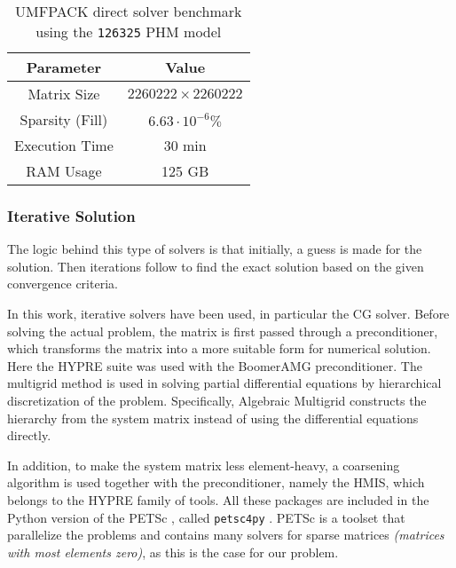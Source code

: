 \begin{table}[!ht]
	\centering
	\caption{\gls{UMFPACK} direct solver benchmark using the \texttt{126325} \gls{PHM} model}
	\label{tab:direct_solver_bench}
	\begin{tabular}{|c|c|}
		\hline
		\rowcolor[HTML]{C0C0C0} 
		\textbf{Parameter} & \textbf{Value} \\ \hline
		Matrix Size & $2260222\times 2260222$ \\ \hline
		Sparsity (Fill) & $6.63\cdot 10^{-6}\%$ \\ \hline
		Execution Time & 30 min \\ \hline
		RAM Usage & 125 GB \\ \hline
	\end{tabular}
\end{table}

\subsubsection{Iterative Solution}
\label{subsec:iterative_solvers}

The logic behind this type of solvers is that initially, a guess is made for the solution. Then iterations follow to find the exact solution based on the given convergence criteria.

In this work, iterative solvers have been used, in particular the \gls{CG} solver. Before solving the actual problem, the matrix is first passed through a preconditioner, which transforms the matrix into a more suitable form for numerical solution. Here the \gls{HYPRE} \cite{hypre-web-page} suite was used with the Boomer\gls{AMG} \cite[chapter 4]{McCormick1987_amg} preconditioner. The multigrid method is used in solving partial differential equations by hierarchical discretization of the problem. Specifically, Algebraic Multigrid constructs the hierarchy from the system matrix instead of using the differential equations directly. 

In addition, to make the system matrix less element-heavy, a coarsening algorithm is used together with the preconditioner, namely the \gls{HMIS}, which belongs to the \gls{HYPRE} family of tools. All these packages are included in the Python version of the \gls{PETSc} \cite{petsc-web-page,petsc-user-ref,petsc-efficient}, called \texttt{petsc4py} \cite{Dalcin2011}. \gls{PETSc} is a toolset that parallelize the problems and contains many solvers for sparse matrices \textit{(matrices with most elements zero)}, as this is the case for our problem.

